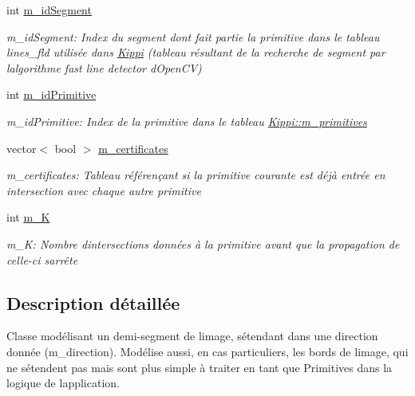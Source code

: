 \begin{DoxyCompactItemize}
\mbox{\label{classPrimitive_a6cd5569c0d6016390c6e2d83764326fe}} 
int \hyperlink{classPrimitive_a6cd5569c0d6016390c6e2d83764326fe}{m\+\_\+id\+Segment}
\begin{DoxyCompactList}\small\item\em m\+\_\+id\+Segment\+: Index du segment dont fait partie la primitive dans le tableau lines\+\_\+fld utilisée dans \hyperlink{classKippi}{Kippi} (tableau résultant de la recherche de segment par l\textquotesingle{}algorithme fast line detector d\textquotesingle{}Open\+CV) \end{DoxyCompactList}\item 
\mbox{\label{classPrimitive_a257ded40eb050dc78a3ca0010855b72f}} 
int \hyperlink{classPrimitive_a257ded40eb050dc78a3ca0010855b72f}{m\+\_\+id\+Primitive}
\begin{DoxyCompactList}\small\item\em m\+\_\+id\+Primitive\+: Index de la primitive dans le tableau \hyperlink{classKippi_a27b6bb80d6de150819bdf84a68f5a649}{Kippi\+::m\+\_\+primitives} \end{DoxyCompactList}\item 
\mbox{\label{classPrimitive_a9773acb10509e3c459cf55473e23232c}} 
vector$<$ bool $>$ \hyperlink{classPrimitive_a9773acb10509e3c459cf55473e23232c}{m\+\_\+certificates}
\begin{DoxyCompactList}\small\item\em m\+\_\+certificates\+: Tableau référençant si la primitive courante est déjà entrée en intersection avec chaque autre primitive \end{DoxyCompactList}\item 
\mbox{\label{classPrimitive_adedc640045d803d7634d0dc036bbf07b}} 
int \hyperlink{classPrimitive_adedc640045d803d7634d0dc036bbf07b}{m\+\_\+K}
\begin{DoxyCompactList}\small\item\em m\+\_\+K\+: Nombre d\textquotesingle{}intersections données à la primitive avant que la propagation de celle-\/ci s\textquotesingle{}arrête \end{DoxyCompactList}\end{DoxyCompactItemize}


\subsection{Description détaillée}
Classe modélisant un demi-\/segment de l\textquotesingle{}image, s\textquotesingle{}étendant dans une direction donnée (m\+\_\+direction). Modélise aussi, en cas particuliers, les bords de l\textquotesingle{}image, qui ne s\textquotesingle{}étendent pas mais sont plus simple à traiter en tant que Primitives dans la logique de l\textquotesingle{}application. 

